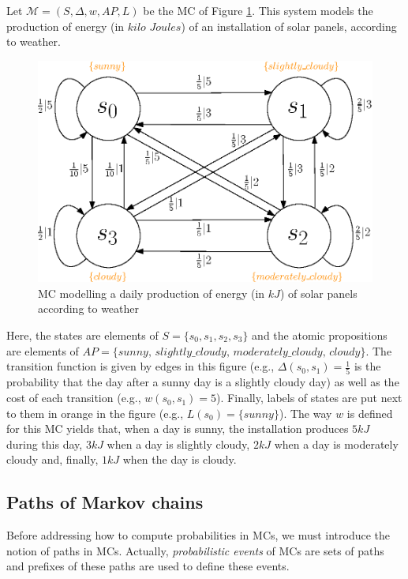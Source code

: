 \begin{example}\label{solar-panel}
  Let \sloppy $\mathcal{M} = (S, \Delta, w, AP, L)$ be the MC of Figure \ref{MCexample}. This system models the production of energy (in $kilo$ $Joules$) of
  an installation of solar panels, according to weather.
  \begin{figure}[h!]
    \centering
    \captionsetup{justification=centering}
    \includegraphics[width=0.6\linewidth]{resources/weather-solar-pannel}
    \caption{MC modelling a daily production of energy (in $kJ$) of solar panels according to weather}
    \label{MCexample}
  \end{figure}
  Here, the states are elements of $S = \{s_0, s_1, s_2, s_3\}$ and the atomic propositions are elements of $AP = \{sunny, \, slightly\_cloudy, \, moderately\_cloudy, \, cloudy \}$. The transition function is given by edges in this figure (e.g., $\Delta(s_0, s_1) = \frac{1}{5}$ is the probability that the day after a sunny day is a slightly cloudy day) as well as the
  cost of each transition (e.g., $w(s_0, s_1) = 5$). Finally, labels of states
  are put next to them in orange in the figure (e.g., $L(s_0) = \{sunny\}$).
  The way $w$ is defined for this MC yields that, when a day is sunny, the installation produces $5 kJ$ during this day, $3 kJ$ when a day is slightly cloudy, $2 kJ$ when a day is moderately cloudy and, finally, $1 kJ$ when the day is cloudy.
\end{example}

\subsection{Paths of Markov chains}
Before addressing how to compute probabilities in MCs, we must introduce the notion of paths in MCs. Actually, \textit{probabilistic events} of MCs are sets of paths and prefixes of these paths are used to define these events.


